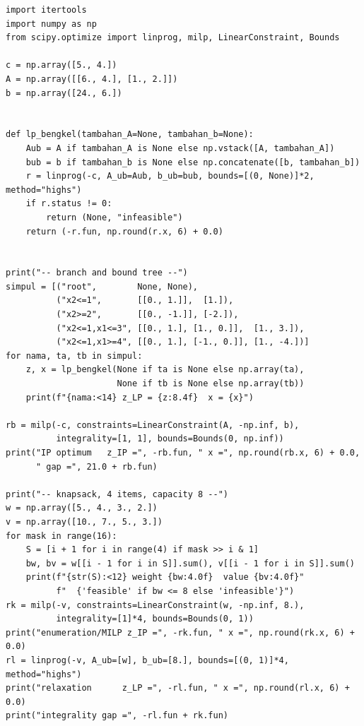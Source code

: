 \begin{lab}
\begin{verbatim}
import itertools
import numpy as np
from scipy.optimize import linprog, milp, LinearConstraint, Bounds

c = np.array([5., 4.])
A = np.array([[6., 4.], [1., 2.]])
b = np.array([24., 6.])


def lp_bengkel(tambahan_A=None, tambahan_b=None):
    Aub = A if tambahan_A is None else np.vstack([A, tambahan_A])
    bub = b if tambahan_b is None else np.concatenate([b, tambahan_b])
    r = linprog(-c, A_ub=Aub, b_ub=bub, bounds=[(0, None)]*2, method="highs")
    if r.status != 0:
        return (None, "infeasible")
    return (-r.fun, np.round(r.x, 6) + 0.0)


print("-- branch and bound tree --")
simpul = [("root",        None, None),
          ("x2<=1",       [[0., 1.]],  [1.]),
          ("x2>=2",       [[0., -1.]], [-2.]),
          ("x2<=1,x1<=3", [[0., 1.], [1., 0.]],  [1., 3.]),
          ("x2<=1,x1>=4", [[0., 1.], [-1., 0.]], [1., -4.])]
for nama, ta, tb in simpul:
    z, x = lp_bengkel(None if ta is None else np.array(ta),
                      None if tb is None else np.array(tb))
    print(f"{nama:<14} z_LP = {z:8.4f}  x = {x}")

rb = milp(-c, constraints=LinearConstraint(A, -np.inf, b),
          integrality=[1, 1], bounds=Bounds(0, np.inf))
print("IP optimum   z_IP =", -rb.fun, " x =", np.round(rb.x, 6) + 0.0,
      " gap =", 21.0 + rb.fun)

print("-- knapsack, 4 items, capacity 8 --")
w = np.array([5., 4., 3., 2.])
v = np.array([10., 7., 5., 3.])
for mask in range(16):
    S = [i + 1 for i in range(4) if mask >> i & 1]
    bw, bv = w[[i - 1 for i in S]].sum(), v[[i - 1 for i in S]].sum()
    print(f"{str(S):<12} weight {bw:4.0f}  value {bv:4.0f}"
          f"  {'feasible' if bw <= 8 else 'infeasible'}")
rk = milp(-v, constraints=LinearConstraint(w, -np.inf, 8.),
          integrality=[1]*4, bounds=Bounds(0, 1))
print("enumeration/MILP z_IP =", -rk.fun, " x =", np.round(rk.x, 6) + 0.0)
rl = linprog(-v, A_ub=[w], b_ub=[8.], bounds=[(0, 1)]*4, method="highs")
print("relaxation      z_LP =", -rl.fun, " x =", np.round(rl.x, 6) + 0.0)
print("integrality gap =", -rl.fun + rk.fun)


\end{verbatim}
\end{lab}
